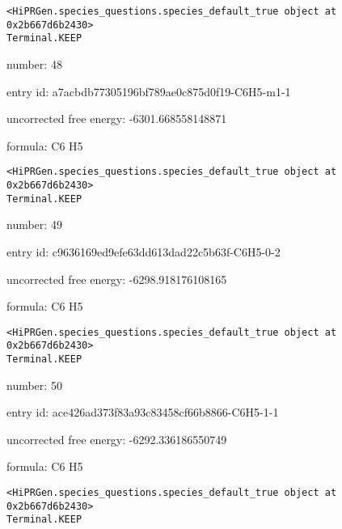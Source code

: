 \documentclass{article}
\begin{document}
\vspace{1cm}
\begin{verbatim}
<HiPRGen.species_questions.species_default_true object at 0x2b667d6b2430>
Terminal.KEEP
\end{verbatim}


number: 48



entry id: a7acbdb77305196bf789ae0c875d0f19-C6H5-m1-1



uncorrected free energy: -6301.668558148871



formula: C6 H5


\vspace{1cm}
\begin{verbatim}
<HiPRGen.species_questions.species_default_true object at 0x2b667d6b2430>
Terminal.KEEP
\end{verbatim}


number: 49



entry id: c9636169ed9efe63dd613dad22c5b63f-C6H5-0-2



uncorrected free energy: -6298.918176108165



formula: C6 H5


\vspace{1cm}
\begin{verbatim}
<HiPRGen.species_questions.species_default_true object at 0x2b667d6b2430>
Terminal.KEEP
\end{verbatim}


number: 50



entry id: ace426ad373f83a93c83458cf66b8866-C6H5-1-1



uncorrected free energy: -6292.336186550749



formula: C6 H5


\vspace{1cm}
\begin{verbatim}
<HiPRGen.species_questions.species_default_true object at 0x2b667d6b2430>
Terminal.KEEP
\end{verbatim}
\end{document}

